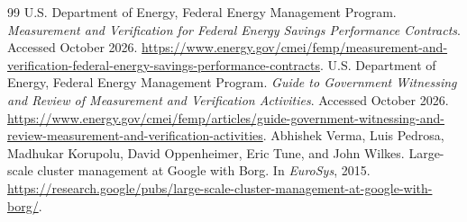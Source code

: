 \documentclass[11pt,letterpaper]{article}
\theoremstyle{remark}\newtheorem{remark}{Remark}[section]
\begin{document}
\begin{thebibliography}{99}
U.S. Department of Energy, Federal Energy Management Program. \emph{Measurement and Verification for Federal Energy Savings Performance Contracts}. Accessed October 2026. \url{https://www.energy.gov/cmei/femp/measurement-and-verification-federal-energy-savings-performance-contracts}.
U.S. Department of Energy, Federal Energy Management Program. \emph{Guide to Government Witnessing and Review of Measurement and Verification Activities}. Accessed October 2026. \url{https://www.energy.gov/cmei/femp/articles/guide-government-witnessing-and-review-measurement-and-verification-activities}.
Abhishek Verma, Luis Pedrosa, Madhukar Korupolu, David Oppenheimer, Eric Tune, and John Wilkes. Large-scale cluster management at Google with Borg. In \emph{EuroSys}, 2015. \url{https://research.google/pubs/large-scale-cluster-management-at-google-with-borg/}.
\end{thebibliography}
\end{document}
